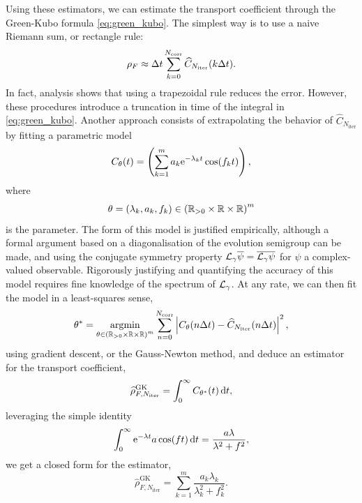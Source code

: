 Using these estimators, we can estimate the transport coefficient through the Green-Kubo formula \eqref{eq:green_kubo}. The simplest way is to use a naive Riemann sum, or rectangle rule:
\[\rho_F \approx {\Delta t}\sum_{k=0}^{N_{\mathrm{corr}}} \widehat{C}_{N_{\mathrm{iter}}}(k{\Delta t}).\]
In fact, analysis shows that using a trapezoidal rule reduces the error.
However, these procedures introduce a truncation in time of the integral in \eqref{eq:green_kubo}.
Another approach consists of extrapolating the behavior of $\widehat{C}_{N_{\mathrm{iter}}}$ by fitting a parametric model 
\begin{equation}
    \label{eq:time_correlation_parametric_model}
    C_{\theta}(t)=\left(\sum_{k=1}^{m}a_k\mathrm{e}^{-\lambda_k t}\cos(f_k t)\right),
\end{equation}
where \[\theta=(\lambda_k,a_k,f_k)\in \left(\mathbb{R}_{>0}\times\mathbb{R}\times \mathbb{R}\right)^{m}\]
is the parameter. The form of this model is justified empirically, although a formal argument based on a diagonalisation of the evolution semigroup can be made, and using the conjugate symmetry property
$\mathcal{L}_\gamma \overline{\psi}=\overline{\mathcal{L}_\gamma \psi}$
for $\psi$ a complex-valued observable.
Rigorously justifying and quantifying the accuracy of this model requires fine knowledge of the spectrum of $\mathcal{L}_\gamma$.
At any rate, we can then fit the model in a least-squares sense,
\begin{equation}
    \theta^*=\underset{\theta\in \left(\mathbb{R}_{>0}\times\mathbb{R}\times \mathbb{R}\right)^{m}}{\mathrm{argmin}}\sum_{n=0}^{N_{\mathrm{corr}}}\left| C_{\theta}(n{\Delta t})-\widehat{C}_{N_{\mathrm{iter}}}(n{\Delta t}) \right|^2,
\end{equation}
using gradient descent, or the Gauss-Newton method, and deduce an estimator for the transport coefficient,
\begin{equation}
    \label{eq:rho_F_estimator_GK_fit}
    \widehat{\rho}^{\mathrm{GK}}_{F,N_{\mathrm{iter}}}=\int_0^\infty C_{\theta^*}(t)\,\mathrm{d} t,
\end{equation}
leveraging the simple identity
\begin{equation}
    \label{eq:int_analytic_form}
    \int_0^{\infty}\mathrm{e}^{-\lambda t}a\cos(ft)\,\mathrm{d} t=\frac{a\lambda}{\lambda^2+f^2},
\end{equation}
we get a closed form for the estimator,
\[\widehat{\rho}^{\mathrm{GK}}_{F,N_{\mathrm{iter}}}=\sum_{k=1}^m\frac{a_k\lambda_k}{\lambda_k^2+f_k^2}.\]
